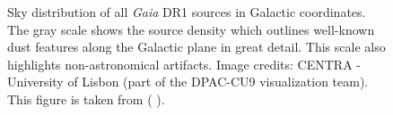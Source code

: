 \begin{figure}[!ht]
\centering
\caption{\scriptsize{ Sky distribution of all \textit{Gaia} DR1 sources in Galactic coordinates. The gray scale shows the source density which outlines well-known dust features along the Galactic plane in great detail. This scale also highlights non-astronomical artifacts. Image credits: CENTRA - University of Lisbon (part of the DPAC-CU9 visualization team). This figure is taken from ( \citeyear{2016A&A...595A...2G}).}}
\label{fig:Gaia_DR1_Flux}
\end{figure}


